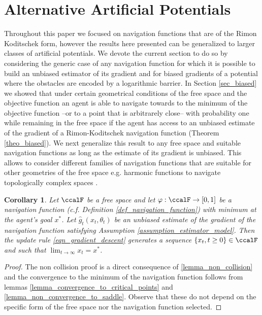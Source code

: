 \documentclass[article]{IEEEtran}
\newtheorem{corollary}{Corollary}
\theoremstyle{definition}
\begin{document}
\section{Alternative Artificial Potentials}\label{sec_other_nf}
Throughout this paper we focused on navigation functions that are of the Rimon Koditschek form, however the results here presented can be generalized to larger classes of artificial potentials. We devote the current section to do so by considering the generic case of any navigation function for which it is possible to build an unbiased estimator of its gradient and for biased gradients of a potential where the obstacles are encoded by a logarithmic barrier. In Section \ref{sec_biased} we showed that under certain geometrical conditions of the free space and the objective function an agent is able to navigate towards to the minimum of the objective function --or to a point that is arbitrarely close-- with probability one while remaining in the free space if the agent has access to an unbiased estimate of the gradient of a Rimon-Koditschek navigation function (Theorem \ref{theo_biased}). We next generalize this result to any free space and suitable navigation functions as long as the estimate of its gradient is unbiased. This allows to consider different families of navigation functions that are suitable for other geometries of the free space e.g. harmonic functions to navigate topologically complex spaces \cite{loizou2011closed,loizou2012navigation}.
%
%
\begin{corollary}
Let $\ccalF$ be a free space and let $\varphi: \ccalF\to [0,1]$ be a navigation function (c.f. Definition \ref{def_navigation_function}) with minimum at the agent's goal $x^*$. Let $\hat{g}_t(x_t,\theta_t)$ be an unbiased estimate of the gradient of the navigation function satisfying Assumption \ref{assumption_estimator_model}. Then the update rule \eqref{eqn_gradient_descent} generates a sequence $\left\{x_t,t\geq0 \right\}\in \ccalF$ and such that $\lim_{t\to\infty} x_t =x^*$. 
\end{corollary}
\begin{proof}
The non collision proof is a direct consequence of \ref{lemma_non_collision} and the convergence to the minimum of the navigation function follows from lemmas \ref{lemma_convergence_to_critical_points} and \ref{lemma_non_convergence_to_saddle}. Observe that these do not depend on the specific form of the free space nor the navigation function selected. 
\end{proof}
\end{document}
